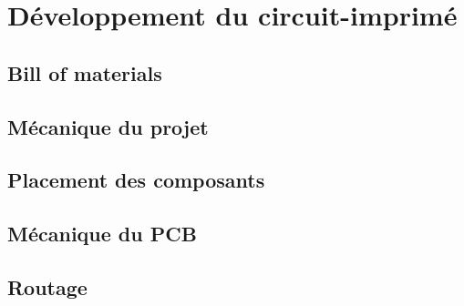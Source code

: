 \section{Développement du circuit-imprimé} \label{sec:Dev-PCB}

\subsection{Bill of materials} \label{ssec:BOM}

\subsection{Mécanique du projet} \label{ssec:mechProjet}

\subsection{Placement des composants} \label{ssec:placementComp}

\subsection{Mécanique du PCB} \label{ssec:Mech-PCB}

\subsection{Routage} \label{ssec:routage}

